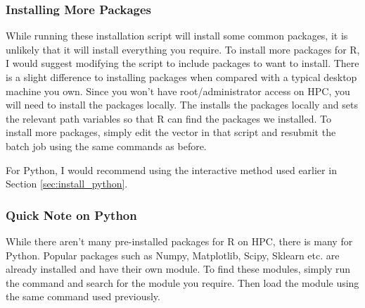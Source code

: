 \subsubsection{Installing More Packages}
%
%
While running these installation script will install some common packages, it is unlikely that it will install everything you require. To install more packages for R, I would suggest modifying the  script to include packages to want to install. There is a slight difference to installing packages when compared with a typical desktop machine you own. Since you won't have root/administrator access on HPC, you will need to install the packages locally. The  installs the packages locally and sets the relevant path variables so that R can find the packages we installed. To install more packages, simply edit the  vector in that script and resubmit the batch job using the same commands as before.
%
%
\par
%
%
%
For Python, I would recommend using the interactive method used earlier in Section \ref{sec:install_python}.
%
%
\subsubsection{Quick Note on Python}
%
%
While there aren't many pre-installed packages for R on HPC, there is many for Python. Popular packages such as Numpy, Matplotlib, Scipy, Sklearn etc. are already installed and have their own module. To find these modules, simply run the  command and search for the module you require. Then load the module using the same  command used previously.
%
%
%
